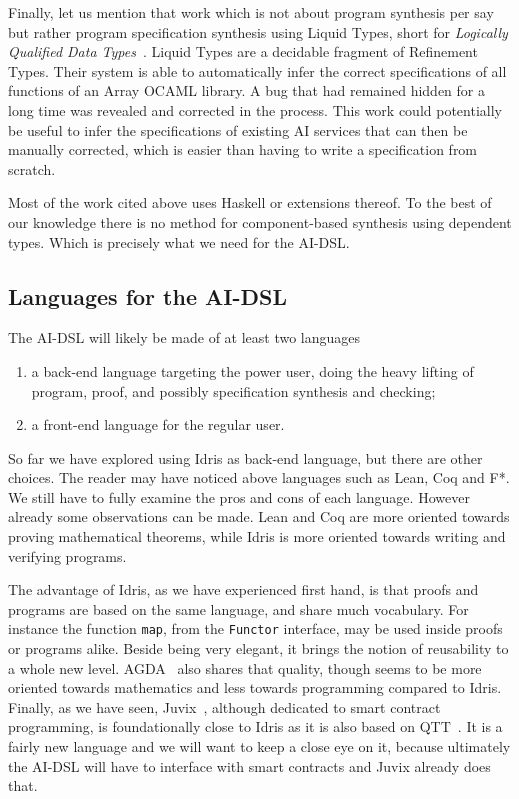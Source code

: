 \documentclass[]{report}
\begin{document}
Finally, let us mention that work which is not about program synthesis
per say but rather program specification synthesis using Liquid Types,
short for \emph{Logically Qualified Data Types}~\cite{Rondon2008}.
Liquid Types are a decidable fragment of Refinement Types.  Their
system is able to automatically infer the correct specifications of
all functions of an Array OCAML library.  A bug that had remained
hidden for a long time was revealed and corrected in the process.
This work could potentially be useful to infer the specifications of
existing AI services that can then be manually corrected, which is
easier than having to write a specification from scratch.

Most of the work cited above uses Haskell or extensions thereof.  To
the best of our knowledge there is no method for component-based
synthesis using dependent types.  Which is precisely what we need for
the AI-DSL.

\subsection{Languages for the AI-DSL}
\label{subsec:languages_aidsl}

The AI-DSL will likely be made of at least two languages
\begin{enumerate}
\item a back-end language targeting the power user, doing the heavy
  lifting of program, proof, and possibly specification synthesis and
  checking;
\item a front-end language for the regular user.
\end{enumerate}
So far we have explored using Idris as back-end language, but there
are other choices.  The reader may have noticed above languages such
as Lean, Coq and F*.  We still have to fully examine the pros and cons
of each language.  However already some observations can be made.
Lean and Coq are more oriented towards proving mathematical theorems,
while Idris is more oriented towards writing and verifying programs.

The advantage of Idris, as we have experienced first hand, is that
proofs and programs are based on the same language, and share much
vocabulary.  For instance the function \texttt{map}, from the
\texttt{Functor} interface, may be used inside proofs or programs
alike.  Beside being very elegant, it brings the notion of reusability
to a whole new level.  AGDA~\cite{Norell2009} also shares that
quality, though seems to be more oriented towards mathematics and less
towards programming compared to Idris.  Finally, as we have seen,
Juvix~\cite{Goes2020}, although dedicated to smart contract
programming, is foundationally close to Idris as it is also based on
QTT~\cite{Atkey2018}.  It is a fairly new language and we will want to
keep a close eye on it, because ultimately the AI-DSL will have to
interface with smart contracts and Juvix already does that.
\end{document}
